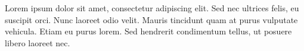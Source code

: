 \documentclass[
11pt, %
english, %
singlespacing, %
parskip, %
headsepline, %
]{master-thesis} %
\begin{document}

\begin{acknowledgements}
\addchaptertocentry{\acknowledgementname} %
Lorem ipsum dolor sit amet, consectetur adipiscing elit. Sed nec ultrices felis, eu suscipit orci. Nunc laoreet odio velit. Mauris tincidunt quam at purus vulputate vehicula. Etiam eu purus lorem. Sed hendrerit condimentum tellus, ut posuere libero laoreet nec. 

\end{acknowledgements}


\tableofcontents %

\listoffigures %
\end{document}
